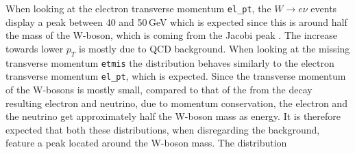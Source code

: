     When looking at the electron transverse momentum \texttt{el\_pt}, the $W \rightarrow e\nu$ events display a peak between 40 and 50\,GeV which is expected since this 
    is around half the mass of the W-boson, which is coming from the Jacobi peak \cite{manual}. The increase towards lower $p_T$ is mostly due to QCD background.
    When looking at the missing transverse momentum \texttt{etmis} the distribution behaves similarly to the electron transverse momentum \texttt{el\_pt}, which is expected.
    Since the transverse momentum of the W-bosons is mostly small, compared to that of the from the decay resulting electron and neutrino, due to momentum conservation, the 
    electron and the neutrino get approximately half the W-boson mass as energy. It is therefore expected that both these distributions, when disregarding the background, 
    feature a peak located around the W-boson mass. The distribution 
